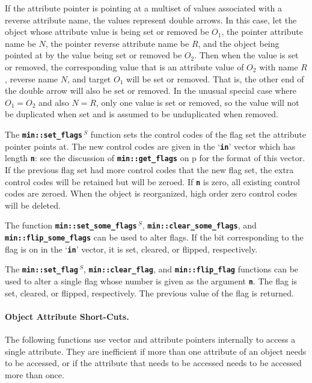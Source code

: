 \documentclass[12pt]{article}
\newcommand{\subsubsubsection}[1]{\paragraph[#1]{#1.}}
\newcommand{\TT}[1]{{\tt \bfseries #1}}
\newcommand{\pagref}[1]{p\pageref{#1}}
\newcommand{\EOL}{\penalty \exhyphenpenalty}
\newcommand{\RESIZE}{$\,^S$}
\begin{document}
If the attribute pointer is pointing at a multiset of values
associated with a reverse attribute name,
the values represent double arrows.
In this case, let the object whose attribute value is being set or removed
be $O_1$, the pointer attribute name be $N$, the pointer reverse
attribute name be $R$, and the object being pointed at by the value
being set or removed be $O_2$.
Then when the value is set or removed, the corresponding value that is
an attribute value of $O_2$ with name $R$, reverse name $N$, and target $O_1$
will be set or removed.
That is, the other end of the double arrow will also be set or removed.
In the unusual special case where $O_1=O_2$ and also $N=R$, only one value
is set or removed, so the value will not be duplicated when set and is
assumed to be unduplicated when removed.

The \TT{min::\EOL set\_\EOL flags\RESIZE} function sets the control codes
of the flag set the attribute pointer points at.
The new control codes are given in the `\TT{in}' vector which
has length \TT{n}: see the discussion of
\TT{min::\EOL get\_\EOL flags} on \pagref{MIN::GET_FLAGS_OF_ATTR}
for the format of this vector.
If the previous flag set had more control codes that the new flag
set, the extra control codes will be retained but will be zeroed.
If \TT{n} is zero, all existing control codes are zeroed.
When the object is reorganized, high order zero control codes will
be deleted.

The function \TT{min::\EOL set\_\EOL some\_\EOL flags\RESIZE},
\TT{min::\EOL clear\_\EOL some\_\EOL flags},
and \TT{min::\EOL flip\_\EOL some\_\EOL flags}
can be used to alter flags.  If the bit corresponding
to the flag is on in the `\TT{in}' vector, it is set, cleared,
or flipped, respectively.

The \TT{min::\EOL set\_\EOL flag\RESIZE},
\TT{min::\EOL clear\_\EOL flag},
and \TT{min::\EOL flip\_\EOL flag}
functions can be used to alter a single flag whose number is
given as the argument \TT{n}.  The flag is set, cleared,
or flipped, respectively.  The previous value of the flag is
returned.

\subsubsubsection{Object Attribute Short-Cuts}
\label{OBJECT ATTRIBUTE SHORT-CUTS}

The following functions use vector and attribute pointers
internally to access a single attribute.  They are inefficient
if more than one attribute of an object needs to be accessed,
or if the attribute that needs to be accessed needs to be
accessed more than once.
\end{document}
